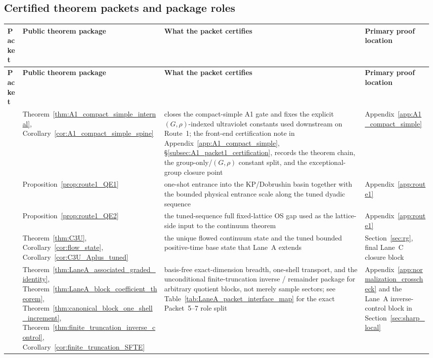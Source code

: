 \subsection{Certified theorem packets and package roles}
\label{subsec:load_bearing_graph}

\begingroup
\small
\setlength{\tabcolsep}{3pt}
\begin{longtable}{@{}
>{\RaggedRight\arraybackslash}p{}
>{\RaggedRight\arraybackslash}p{}
>{\RaggedRight\arraybackslash}p{}
>{\RaggedRight\arraybackslash}p{}@{}}
\toprule
\textbf{Packet} & \textbf{Public theorem package} & \textbf{What the packet certifies} & \textbf{Primary proof location}\\
\midrule
\endfirsthead
\toprule
\textbf{Packet} & \textbf{Public theorem package} & \textbf{What the packet certifies} & \textbf{Primary proof location}\\
\midrule
\endhead
1 & Theorem~\ref{thm:A1_compact_simple_internal}, Corollary~\ref{cor:A1_compact_simple_spine} & closes the compact-simple A1 gate and fixes the explicit $(G,\rho)$-indexed ultraviolet constants used downstream on Route~1; the front-end certification note in Appendix~\ref{app:A1_compact_simple}, \S\ref{subsec:A1_packet1_certification}, records the theorem chain, the group-only/$(G,\rho)$ constant split, and the exceptional-group closure point & Appendix~\ref{app:A1_compact_simple}\\[0.4em]

2 & Proposition~\ref{prop:route1_QE1} & one-shot entrance into the KP/Dobrushin basin together with the bounded physical entrance scale along the tuned dyadic sequence & Appendix~\ref{app:route1}\\[0.4em]

3 & Proposition~\ref{prop:route1_QE2} & the tuned-sequence full fixed-lattice OS gap used as the lattice-side input to the continuum theorem & Appendix~\ref{app:route1}\\[0.4em]

4 & Theorem~\ref{thm:C3U}, Corollary~\ref{cor:flow_state}, Corollary~\ref{cor:C3U_Aplus_tuned} & the unique flowed continuum state and the tuned bounded positive-time base state that Lane~A extends & Section~\ref{sec:rg}, final Lane~C closure block\\[0.4em]

5 & Theorem~\ref{thm:LaneA_associated_graded_identity}, Theorem~\ref{thm:LaneA_block_coefficient_theorem}, Theorem~\ref{thm:canonical_block_one_shell_increment}, Theorem~\ref{thm:finite_truncation_inverse_control}, Corollary~\ref{cor:finite_truncation_SFTE} & basis-free exact-dimension breadth, one-shell transport, and the unconditional finite-truncation inverse / remainder package for arbitrary quotient blocks, not merely sample sectors; see Table~\ref{tab:LaneA_packet_interface_map} for the exact Packet~5--7 role split & Appendix~\ref{app:normalization_crosscheck} and the Lane~A inverse-control block in Section~\ref{sec:sharp_local}\\[0.4em]


\end{longtable}
